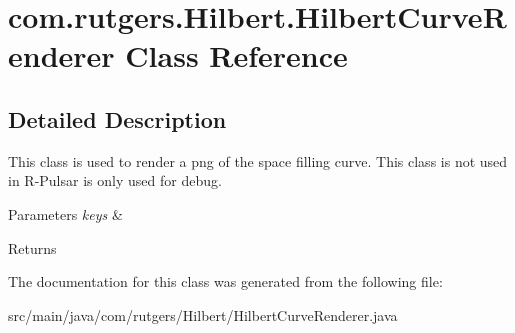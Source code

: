 \hypertarget{classcom_1_1rutgers_1_1Hilbert_1_1HilbertCurveRenderer}{}\section{com.\+rutgers.\+Hilbert.\+Hilbert\+Curve\+Renderer Class Reference}
\label{classcom_1_1rutgers_1_1Hilbert_1_1HilbertCurveRenderer}


\subsection{Detailed Description}
This class is used to render a png of the space filling curve. This class is not used in R-\/\+Pulsar is only used for debug. 
\begin{DoxyParams}{Parameters}
{\em keys} & \\
\hline
\end{DoxyParams}
\begin{DoxyReturn}{Returns}

\end{DoxyReturn}


The documentation for this class was generated from the following file\+:\begin{DoxyCompactItemize}
\item 
src/main/java/com/rutgers/\+Hilbert/Hilbert\+Curve\+Renderer.\+java\end{DoxyCompactItemize}
